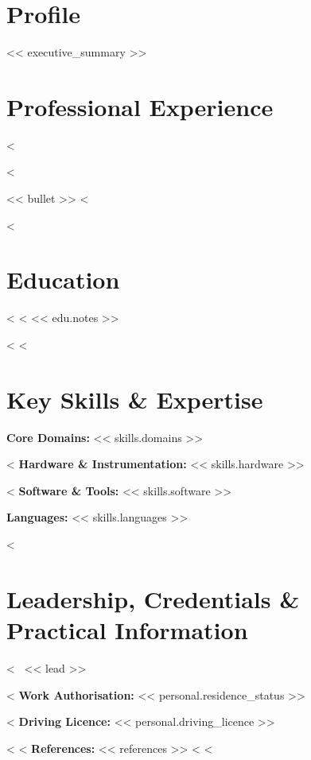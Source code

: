 \documentclass[10pt,a4paper]{article}
\begin{document}

\section*{Profile}
<< executive_summary >>

\section*{Professional Experience}
<%
\begin{cvitems}
<%
  \item << bullet >>
<%
\end{cvitems}
\vspace{2pt}
<%

\section*{Education}
<%
<%
{\small << edu.notes >>}\par
<%
<%

\section*{Key Skills \& Expertise}
\textbf{Core Domains:} << skills.domains >>\par
<%
\textbf{Hardware \& Instrumentation:} << skills.hardware >>\par
<%
\textbf{Software \& Tools:} << skills.software >>\par
\textbf{Languages:} << skills.languages >>

<%
\section*{Leadership, Credentials \& Practical Information}
<%
\textbullet\ << lead >>\par
<%
\textbf{Work Authorisation:} << personal.residence_status >>\par
<%
\textbf{Driving Licence:} << personal.driving_licence >>\par
<%
<%
\textbf{References:} << references >>
<%
<%
\end{document}

